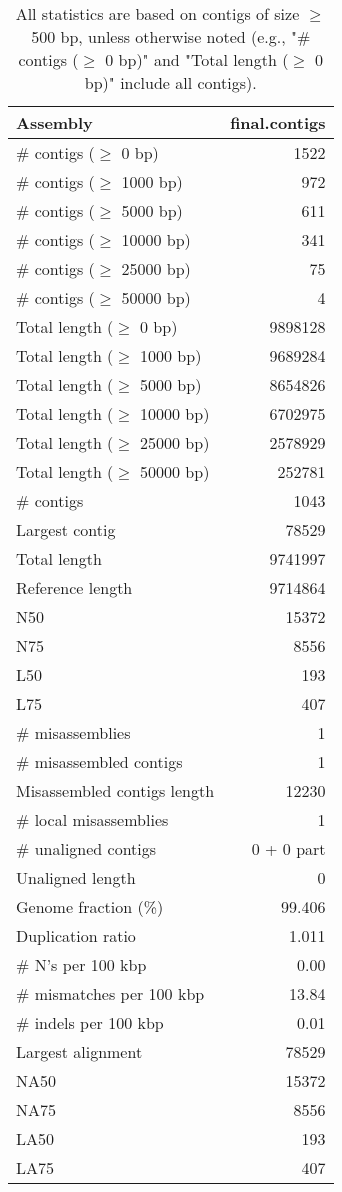 \documentclass[12pt,a4paper]{article}
\begin{document}
\begin{table}[ht]
\begin{center}
\caption{All statistics are based on contigs of size $\geq$ 500 bp, unless otherwise noted (e.g., "\# contigs ($\geq$ 0 bp)" and "Total length ($\geq$ 0 bp)" include all contigs).}
\begin{tabular}{|l*{1}{|r}|}
\hline
Assembly & final.contigs \\ \hline
\# contigs ($\geq$ 0 bp) & 1522 \\ \hline
\# contigs ($\geq$ 1000 bp) & 972 \\ \hline
\# contigs ($\geq$ 5000 bp) & 611 \\ \hline
\# contigs ($\geq$ 10000 bp) & 341 \\ \hline
\# contigs ($\geq$ 25000 bp) & 75 \\ \hline
\# contigs ($\geq$ 50000 bp) & 4 \\ \hline
Total length ($\geq$ 0 bp) & 9898128 \\ \hline
Total length ($\geq$ 1000 bp) & 9689284 \\ \hline
Total length ($\geq$ 5000 bp) & 8654826 \\ \hline
Total length ($\geq$ 10000 bp) & 6702975 \\ \hline
Total length ($\geq$ 25000 bp) & 2578929 \\ \hline
Total length ($\geq$ 50000 bp) & 252781 \\ \hline
\# contigs & 1043 \\ \hline
Largest contig & 78529 \\ \hline
Total length & 9741997 \\ \hline
Reference length & 9714864 \\ \hline
N50 & 15372 \\ \hline
N75 & 8556 \\ \hline
L50 & 193 \\ \hline
L75 & 407 \\ \hline
\# misassemblies & 1 \\ \hline
\# misassembled contigs & 1 \\ \hline
Misassembled contigs length & 12230 \\ \hline
\# local misassemblies & 1 \\ \hline
\# unaligned contigs & 0 + 0 part \\ \hline
Unaligned length & 0 \\ \hline
Genome fraction (\%) & 99.406 \\ \hline
Duplication ratio & 1.011 \\ \hline
\# N's per 100 kbp & 0.00 \\ \hline
\# mismatches per 100 kbp & 13.84 \\ \hline
\# indels per 100 kbp & 0.01 \\ \hline
Largest alignment & 78529 \\ \hline
NA50 & 15372 \\ \hline
NA75 & 8556 \\ \hline
LA50 & 193 \\ \hline
LA75 & 407 \\ \hline
\end{tabular}
\end{center}
\end{table}
\end{document}
